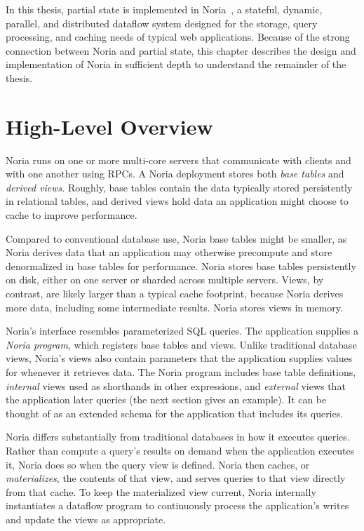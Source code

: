 In this thesis, partial state is implemented in Noria~\cite{noria}, a stateful,
dynamic, parallel, and distributed dataflow system designed for the storage,
query processing, and caching needs of typical web applications. Because of the
strong connection between Noria and partial state, this chapter describes the
design and implementation of Noria in sufficient depth to understand the
remainder of the thesis.

\section{High-Level Overview}

Noria runs on one or more multi-core servers that communicate with clients and
with one another using RPCs. A Noria deployment stores both \emph{base tables}
and \emph{derived views}. Roughly, base tables contain the data typically stored
persistently in relational tables, and derived views hold data an application
might choose to cache to improve performance.

Compared to conventional database use, Noria base tables might be smaller, as
Noria derives data that an application may otherwise precompute and store
denormalized in base tables for performance. Noria stores base tables
persistently on disk, either on one server or sharded across multiple servers.
Views, by contrast, are likely larger than a typical cache footprint, because
Noria derives more data, including some intermediate results. Noria stores views
in memory.

Noria's interface resembles parameterized SQL queries. The application supplies
a \emph{Noria program}, which registers base tables and views. Unlike
traditional database views, Noria's views also contain parameters that the
application supplies values for whenever it retrieves data. The Noria program
includes base table definitions, \emph{internal} views used as shorthands in
other expressions, and \emph{external} views that the application later queries
(the next section gives an example). It can be thought of as an extended schema
for the application that includes its queries.

Noria differs substantially from traditional databases in how it executes
queries. Rather than compute a query's results on demand when the application
executes it, Noria does so when the query view is defined. Noria then caches, or
\emph{materializes}, the contents of that view, and serves queries to that view
directly from that cache. To keep the materialized view current, Noria
internally instantiates a dataflow program to continuously process the
application's writes and update the views as appropriate.

